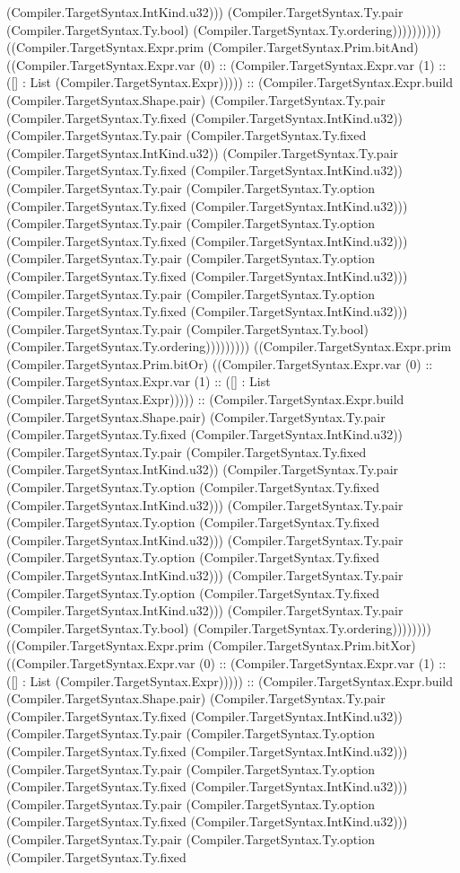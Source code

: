 \documentclass[11pt]{article}
\begin{document}
(Compiler.TargetSyntax.IntKind.u32))) (Compiler.TargetSyntax.Ty.pair (Compiler.TargetSyntax.Ty.bool) (Compiler.TargetSyntax.Ty.ordering)))))))))) ((Compiler.TargetSyntax.Expr.prim (Compiler.TargetSyntax.Prim.bitAnd) ((Compiler.TargetSyntax.Expr.var (0) :: (Compiler.TargetSyntax.Expr.var (1) :: ([] : List (Compiler.TargetSyntax.Expr))))) :: (Compiler.TargetSyntax.Expr.build (Compiler.TargetSyntax.Shape.pair) (Compiler.TargetSyntax.Ty.pair (Compiler.TargetSyntax.Ty.fixed (Compiler.TargetSyntax.IntKind.u32)) (Compiler.TargetSyntax.Ty.pair (Compiler.TargetSyntax.Ty.fixed (Compiler.TargetSyntax.IntKind.u32)) (Compiler.TargetSyntax.Ty.pair (Compiler.TargetSyntax.Ty.fixed (Compiler.TargetSyntax.IntKind.u32)) (Compiler.TargetSyntax.Ty.pair (Compiler.TargetSyntax.Ty.option (Compiler.TargetSyntax.Ty.fixed (Compiler.TargetSyntax.IntKind.u32))) (Compiler.TargetSyntax.Ty.pair (Compiler.TargetSyntax.Ty.option (Compiler.TargetSyntax.Ty.fixed (Compiler.TargetSyntax.IntKind.u32))) (Compiler.TargetSyntax.Ty.pair (Compiler.TargetSyntax.Ty.option (Compiler.TargetSyntax.Ty.fixed (Compiler.TargetSyntax.IntKind.u32))) (Compiler.TargetSyntax.Ty.pair (Compiler.TargetSyntax.Ty.option (Compiler.TargetSyntax.Ty.fixed (Compiler.TargetSyntax.IntKind.u32))) (Compiler.TargetSyntax.Ty.pair (Compiler.TargetSyntax.Ty.bool) (Compiler.TargetSyntax.Ty.ordering))))))))) ((Compiler.TargetSyntax.Expr.prim (Compiler.TargetSyntax.Prim.bitOr) ((Compiler.TargetSyntax.Expr.var (0) :: (Compiler.TargetSyntax.Expr.var (1) :: ([] : List (Compiler.TargetSyntax.Expr))))) :: (Compiler.TargetSyntax.Expr.build (Compiler.TargetSyntax.Shape.pair) (Compiler.TargetSyntax.Ty.pair (Compiler.TargetSyntax.Ty.fixed (Compiler.TargetSyntax.IntKind.u32)) (Compiler.TargetSyntax.Ty.pair (Compiler.TargetSyntax.Ty.fixed (Compiler.TargetSyntax.IntKind.u32)) (Compiler.TargetSyntax.Ty.pair (Compiler.TargetSyntax.Ty.option (Compiler.TargetSyntax.Ty.fixed (Compiler.TargetSyntax.IntKind.u32))) (Compiler.TargetSyntax.Ty.pair (Compiler.TargetSyntax.Ty.option (Compiler.TargetSyntax.Ty.fixed (Compiler.TargetSyntax.IntKind.u32))) (Compiler.TargetSyntax.Ty.pair (Compiler.TargetSyntax.Ty.option (Compiler.TargetSyntax.Ty.fixed (Compiler.TargetSyntax.IntKind.u32))) (Compiler.TargetSyntax.Ty.pair (Compiler.TargetSyntax.Ty.option (Compiler.TargetSyntax.Ty.fixed (Compiler.TargetSyntax.IntKind.u32))) (Compiler.TargetSyntax.Ty.pair (Compiler.TargetSyntax.Ty.bool) (Compiler.TargetSyntax.Ty.ordering)))))))) ((Compiler.TargetSyntax.Expr.prim (Compiler.TargetSyntax.Prim.bitXor) ((Compiler.TargetSyntax.Expr.var (0) :: (Compiler.TargetSyntax.Expr.var (1) :: ([] : List (Compiler.TargetSyntax.Expr))))) :: (Compiler.TargetSyntax.Expr.build (Compiler.TargetSyntax.Shape.pair) (Compiler.TargetSyntax.Ty.pair (Compiler.TargetSyntax.Ty.fixed (Compiler.TargetSyntax.IntKind.u32)) (Compiler.TargetSyntax.Ty.pair (Compiler.TargetSyntax.Ty.option (Compiler.TargetSyntax.Ty.fixed (Compiler.TargetSyntax.IntKind.u32))) (Compiler.TargetSyntax.Ty.pair (Compiler.TargetSyntax.Ty.option (Compiler.TargetSyntax.Ty.fixed (Compiler.TargetSyntax.IntKind.u32))) (Compiler.TargetSyntax.Ty.pair (Compiler.TargetSyntax.Ty.option (Compiler.TargetSyntax.Ty.fixed (Compiler.TargetSyntax.IntKind.u32))) (Compiler.TargetSyntax.Ty.pair (Compiler.TargetSyntax.Ty.option (Compiler.TargetSyntax.Ty.fixed 
\end{document}
